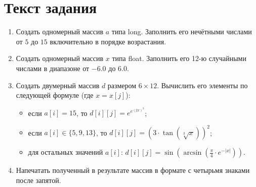 \section{Текст задания}
\begin{enumerate}
\item Создать одномерный массив $a$ типа long. Заполнить его нечётными числами от $5$ до $15$ включительно в порядке возрастания.
\item Создать одномерный массив $x$ типа float. Заполнить его 12-ю случайными числами в диапазоне от $-6.0$ до $6.0$.
\item Создать двумерный массив $d$ размером $6 \times 12 $. Вычислить его элементы по следующей формуле (где $x = x[j]$):
\begin{itemize}
\item если $a[i] = 15$, то $d[i][j]={e}^{{e}^{{(2x)}^3}}$;
\item если $a[i] \in \{5, 9, 13\}$, то $d[i][j]={(3 \cdot \tan(\sqrt[3]{x}))}^2$;
\item для остальных значений $a[i]$: $d[i][j]=\sin(\arcsin(\frac{\pi}{4}\cdot e^{- | x |}))$.
\end{itemize}
\item Напечатать полученный в результате массив в формате с четырьмя знаками после запятой.
\end{enumerate}